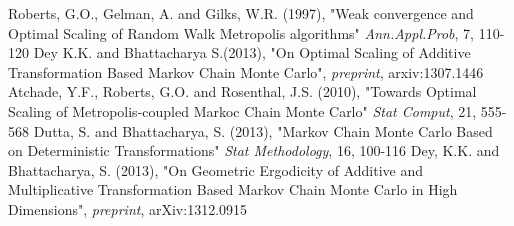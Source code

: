 \documentclass[11pt]{article}
\begin{document}
\begin{thebibliography}{widestlabel}
 Roberts, G.O., Gelman, A. and Gilks, W.R. (1997), "Weak convergence and Optimal Scaling of Random Walk Metropolis algorithms" \emph{Ann.Appl.Prob}, 7, 110-120 
 Dey K.K. and Bhattacharya S.(2013), "On Optimal Scaling of Additive Transformation Based Markov Chain Monte Carlo", \emph{preprint}, arxiv:1307.1446
 Atchade, Y.F., Roberts, G.O. and Rosenthal, J.S. (2010), "Towards Optimal Scaling of Metropolis-coupled Markoc Chain Monte Carlo" \emph{Stat Comput}, 21, 555-568 
 Dutta, S. and Bhattacharya, S. (2013), "Markov Chain Monte Carlo Based on Deterministic Transformations" \emph{Stat Methodology}, 16, 100-116
 Dey, K.K. and Bhattacharya, S. (2013), "On Geometric Ergodicity of Additive and Multiplicative Transformation Based Markov Chain Monte Carlo in High Dimensions", \emph{preprint}, arXiv:1312.0915 
\end{thebibliography}
\end{document}
